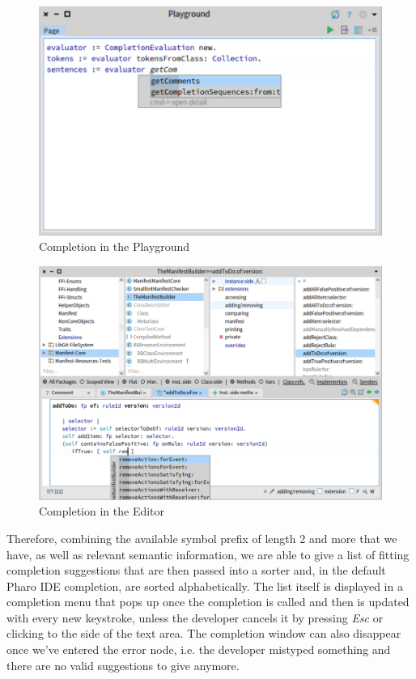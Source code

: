 \begin{figure}[H]
    \centering
    \includegraphics[width=0.9\linewidth]{images/completion1.png}
    \caption{Completion in the Playground}
    \label{fig:playground}
\end{figure}

\begin{figure}[H]
    \centering
    \includegraphics[width=0.9\linewidth]{images/completion2.png}
    \caption{Completion in the Editor}
    \label{fig:editor}
\end{figure}

Therefore, combining the available symbol prefix of length 2 and more that we have, as well as relevant semantic information, we are able to give a list of fitting completion suggestions that are then passed into a sorter and, in the default Pharo IDE completion, are sorted alphabetically. The list itself is displayed in a completion menu that pops up once the completion is called and then is updated with every new keystroke, unless the developer cancels it by pressing \textit{Esc} or clicking to the side of the text area. The completion window can also disappear once we've entered the error node, i.e. the developer mistyped something and there are no valid suggestions to give anymore.

